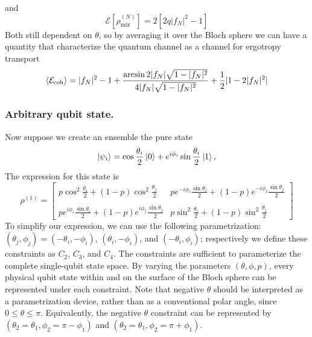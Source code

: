 \documentclass[../../../main.tex]{subfiles}
\begin{document}
and
\begin{equation*}
  \mathcal{E}\left[ \rho_{\text{mix}}^{(N)} \right] = 2[2q |f_N|^2 - 1]
\end{equation*}
Both still dependent on $\theta$, so by averaging it over the Bloch sphere we can have a quantity that characterize the quantum channel as a channel for ergotropy transport
\begin{equation*}
  \braket{\mathcal{E}_\text{coh}} = |f_N|^2-1 + \frac{\arcsin 2|f_N|\sqrt{1-|f_N|^2 }}{4|f_N|\sqrt{1-|f_N|^2}} + \frac{1 }{2} |1-2|f_N|^2 |
\end{equation*}

\subsubsection{Arbitrary qubit state.}
Now suppose we create an ensemble the pure state
\begin{equation*}
  \ket{\psi_i}
  =
  \cos\frac{\theta_i}{2}\ket{0}
  +
  e^{i\phi_i}\sin\frac{\theta_i}{2}\ket{1},
\end{equation*}
The expression for this state is
\begin{equation*}
  \rho^{(1)}  =
  \begin{bmatrix}
    p\cos^2\frac{\theta_i}{2}
    +(1-p)\cos^2\frac{\theta_j}{2}
     &
    p e^{-i\phi_i}\frac{\sin \theta_i}{2}
    +(1-p)e^{-i\phi_j}\frac{\sin \theta_j}{2}
    \\\\
    p e^{i\phi_i}\frac{\sin \theta_i}{2}
    +(1-p)e^{i\phi_j}\frac{\sin \theta_j}{2}
     &
    p\sin^2\frac{\theta_i}{2}
    +(1-p)\sin^2\frac{\theta_j}{2}
  \end{bmatrix}
\end{equation*}
To simplify our expression, we can use the following parametrization: \((\theta_j,\phi_j)=(-\theta_i,-\phi_i)\), \((\theta_i,-\phi_i)\), and \((-\theta_i,\phi_i)\); respectively we define these constraints as $C_2$, $C_3$, and $C_4$.
The constraints are sufficient to parameterize the complete single-qubit state space.
By varying the parameters $(\theta,\phi,p)$, every physical qubit state within and on the surface of the Bloch sphere can be represented under each constraint.
Note that negative \(\theta\) should be interpreted as a parametrization device, rather than as a conventional polar angle, since $0 \leq \theta \leq \pi$.
Equivalently, the negative $\theta$ constraint can be represented by $(\theta_2=\theta_1,\phi_2 = \pi-\phi_1)$ and $(\theta_2=\theta_1,\phi_2 = \pi+\phi_1)$.
\end{document}
